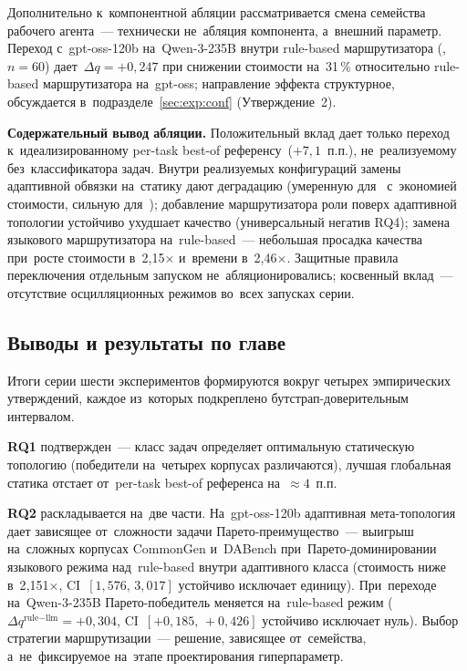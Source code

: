 Дополнительно к~компонентной абляции рассматривается смена семейства
рабочего агента~--- технически не~абляция компонента, а~внешний
параметр. Переход с~gpt-oss-120b на~Qwen-3-235B внутри rule-based
маршрутизатора (, $n=60$) дает~$\Delta q=+0{,}247$ при
снижении стоимости на~31\,\% относительно rule-based маршрутизатора
на~gpt-oss; направление эффекта структурное, обсуждается
в~подразделе~\ref{sec:exp:conf} (Утверждение~2).

\textbf{Содержательный вывод абляции.} Положительный вклад дает только
переход к~идеализированному per-task best-of референсу~($+7{,}1$~п.п.),
не~реализуемому без~классификатора задач. Внутри реализуемых конфигураций
замены адаптивной обвязки на~статику дают деградацию (умеренную
для~ с~экономией стоимости, сильную для~); добавление
маршрутизатора роли поверх адаптивной топологии устойчиво ухудшает
качество (универсальный негатив RQ4); замена языкового маршрутизатора
на~rule-based~--- небольшая просадка качества при~росте стоимости
в~2,15$\times$ и~времени в~2,46$\times$. Защитные правила переключения
отдельным запуском не~абляционировались; косвенный вклад~--- отсутствие
осцилляционных режимов во~всех запусках серии.

\subsection{Выводы и результаты по главе}
\label{sec:exp:summary}

Итоги серии шести экспериментов формируются вокруг четырех
эмпирических утверждений, каждое из~которых подкреплено
бутстрап-доверительным интервалом.

\textbf{RQ1} подтвержден~--- класс задач определяет оптимальную
статическую топологию (победители на~четырех корпусах различаются),
лучшая глобальная статика отстает от~per-task best-of референса
на~$\approx4$~п.п.

\textbf{RQ2} раскладывается на~две части. На~gpt-oss-120b адаптивная
мета-топология дает зависящее от~сложности задачи Парето-преимущество~---
выигрыш на~сложных корпусах CommonGen и~DABench при~Парето-доминировании
языкового режима над~rule-based внутри адаптивного класса (стоимость
ниже в~2{,}151$\times$, CI~$[1{,}576,\,3{,}017]$ устойчиво исключает
единицу). При~переходе на~Qwen-3-235B Парето-победитель меняется
на~rule-based режим ($\Delta q^{\text{rule}-\text{llm}}=+0{,}304$,
CI~$[+0{,}185,\,+0{,}426]$ устойчиво исключает нуль). Выбор стратегии
маршрутизации~--- решение, зависящее от~семейства, а~не~фиксируемое на~этапе проектирования
гиперпараметр.

